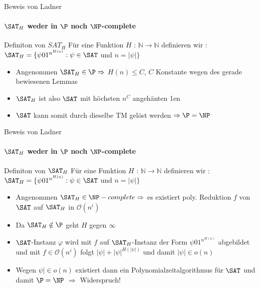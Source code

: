 % 				
% 		
% 	
% 	
\begin{frame}{Beweis von Ladner}
	\framesubtitle{${\SAT}_H$ weder in $\P$ noch  $\NP$-complete}
	\begin{KITinfoblock}{Definiton von ${SAT}_H$}
		Für eine Funktion $H$ : $\mathbb{N} \rightarrow \mathbb{N}$ definieren wir : \newline 	
		${\SAT}_H = \lbrace \psi 01^{n^{H(n)}} : \psi \in \SAT$ und $ n = |\psi| \rbrace$
	\end{KITinfoblock}
	\bigskip
	\pause
	\bigskip
	\begin{itemize}[<+->]
		\item Angenommen ${\SAT}_H \in \P \Rightarrow $  $H(n) \le C$, $C$ Konstante wegen des gerade bewiesenen Lemmas
		\item ${\SAT}_H$ ist also $\SAT$  mit höchsten $n^C$  angehänten 1en
		\item $\SAT$ kann somit durch dieselbe TM gelöst werden $\Rightarrow \P = \NP$
	\end{itemize}
	
\end{frame}

\begin{frame}{Beweis von Ladner}
		\framesubtitle{${\SAT}_H$ weder in $\P$ noch $\NP$-complete}
	
		\begin{KITinfoblock}{Definiton von ${\SAT}_H$}
			Für eine Funktion $H$ : $\mathbb{N} \rightarrow \mathbb{N}$ definieren wir : \newline 	
			${\SAT}_H = \lbrace \psi 01^{n^{H(n)}} : \psi \in \SAT$ und $ n = |\psi| \rbrace$
		\end{KITinfoblock}
		
		
		\bigskip
		
		\bigskip
		\pause
		\begin{itemize}[<+->]
		\item Angenommen ${\SAT}_H \in \NP-complete \Rightarrow $ es existiert poly. Reduktion $f$ von $\SAT$ auf ${\SAT}_H$ in $\mathcal{O}(n^i)$
		\item Da ${\SAT}_H \notin \P $ geht $H$ gegen $\infty$ 
		\item $\SAT$-Instanz $\varphi$ wird mit $f$ auf ${\SAT}_H$-Instanz der Form $\psi01^{n^{H(n)}}$ abgebildet und mit $ f \in \mathcal{O}(n^i)$ folgt \newline
		$|\psi| + {|\psi|}^{H(|\psi|)}$ und damit $|\psi| \in o(n)$
		\item Wegen $\psi| \in o(n)$ existiert dann ein Polynomialzeitalgorithmus für $\SAT$ und damit $\P = \NP$  $\Rightarrow$ Widerspruch! 
		
		\end{itemize}
\end{frame}